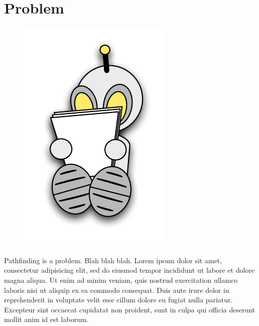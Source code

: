 \section{Problem}
 \begin{figure}
\vspace{-5.5em}
		\includegraphics[width=0.2\columnwidth]{diagrams/robot_reading.pdf}
 \end{figure}

Pathfinding is a problem. Blah blah blah.
Lorem ipsum dolor sit amet, consectetur adipisicing elit, sed do eiusmod
tempor incididunt ut labore et dolore magna aliqua. Ut enim ad minim
veniam, quis nostrud exercitation ullamco laboris nisi ut aliquip ex ea
commodo consequat. Duis aute irure dolor in reprehenderit in voluptate
velit esse cillum dolore eu fugiat nulla pariatur. Excepteur sint occaecat
cupidatat non proident, sunt in culpa qui officia deserunt mollit anim
id est laborum.



